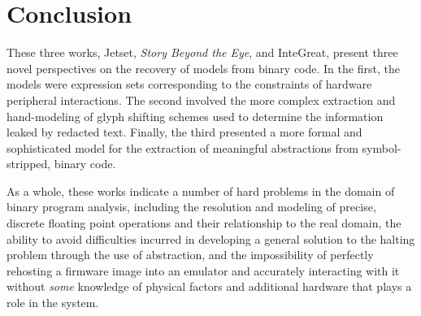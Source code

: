 \newenvironment{prettylist}{
	\begin{list}{
		\footnotesize\raisebox{0pt}{\small\ding{121}}
	}{
		\setlength\topsep{2pt plus 1pt minus 1pt}
		\setlength\leftmargin{2em}
		\setlength\rightmargin{0pt}
		\setlength\itemsep{1pt plus.1pt}
		\setlength\parskip{0pt}
		\setlength\parsep{0pt}
		\setlength\itemindent{0pt}
	}
}{
	\end{list}
}







\section{Conclusion}

These three works, Jetset, \emph{Story Beyond the Eye}, and InteGreat, present three novel perspectives on the recovery of models from binary code.
In the first, the models were expression sets corresponding to the constraints of hardware peripheral interactions.
The second involved the more complex extraction and hand-modeling of glyph shifting schemes used to determine the information leaked by redacted text.
Finally, the third presented a more formal and sophisticated model for the extraction of meaningful abstractions from symbol-stripped, binary code.

As a whole, these works indicate a number of hard problems in the domain of binary program analysis, including the resolution and modeling of precise, discrete floating point operations and their relationship to the real domain, the ability to avoid difficulties incurred in developing a general solution to the halting problem through the use of abstraction, and the impossibility of perfectly rehosting a firmware image into an emulator and accurately interacting with it without \emph{some} knowledge of physical factors and additional hardware that plays a role in the system.

